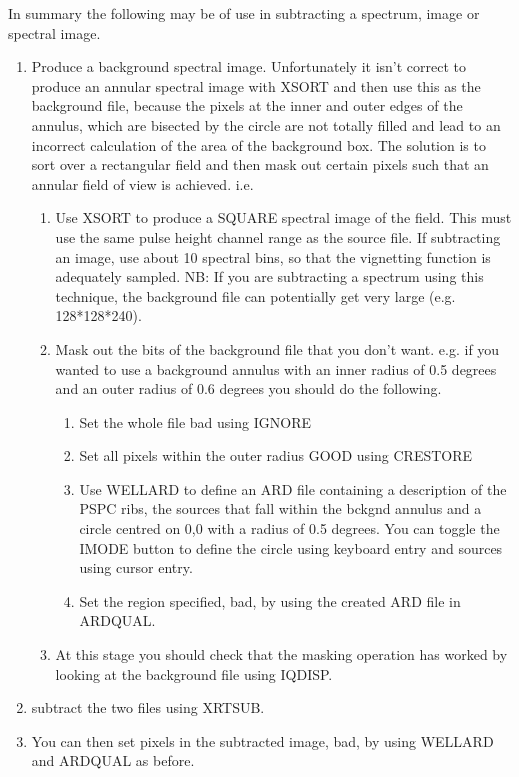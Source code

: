 \documentclass{book}
\renewcommand{\_}{{\tt\char'137}}     %
\begin{document}
In summary the following may be of use in subtracting a spectrum,
image or spectral image.


\begin{enumerate}
\item Produce a background spectral image. Unfortunately it isn't
correct to produce an annular spectral image with XSORT and then
use this as the background file, because the pixels at the inner and
outer edges of the annulus, which are bisected by the circle are
not totally filled and lead to an incorrect calculation of the area
of the background box. The solution is to sort over a rectangular
field and then mask out certain pixels such that an annular field
of view is achieved. i.e.

\begin{enumerate}
\item Use XSORT to produce a SQUARE spectral image of the field. This
must use the same pulse height channel range as the source file.
If subtracting an image, use about 10 spectral bins, so that the
vignetting function is adequately sampled. NB: If you are
subtracting a spectrum using this technique, the background file
can potentially get very large (e.g. 128*128*240).
\item Mask out the bits of the background file that you don't want.
e.g. if you wanted to use a background annulus with an inner
radius of 0.5 degrees and an outer radius of 0.6 degrees you
should do the following.

\begin{enumerate}
\item Set the whole file bad using IGNORE
\item Set all pixels within the outer radius GOOD using CRESTORE
\item Use WELLARD to define an ARD file containing a description
of the PSPC ribs, the sources that fall within the bckgnd
annulus and a circle centred on 0,0 with a radius of 0.5
degrees. You can toggle the IMODE button to define the
circle using keyboard entry and sources using cursor entry.
\item Set the region specified, bad, by using the created ARD file
in ARDQUAL.
\end{enumerate}
\item At this stage you should check that the masking operation has
worked by looking at the background file using IQDISP.
\end{enumerate}
\item subtract the two files using XRTSUB.
\item You can then set pixels in the subtracted image, bad, by
using WELLARD and ARDQUAL as before.
\end{enumerate}
\end{document}
